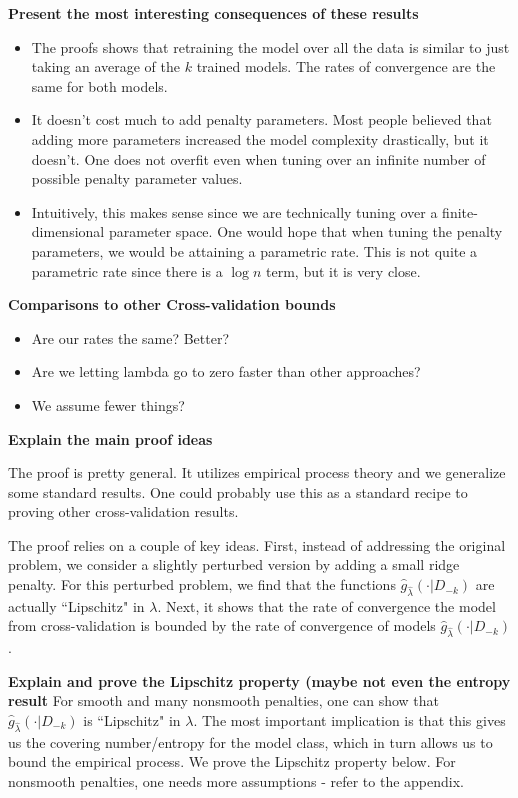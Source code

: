 \documentclass[12pt]{article}
\begin{document}
\textbf{Present the most interesting consequences of these results}
\begin{itemize}
\item{The proofs shows that retraining the model over all the data is similar to just taking an average of the $k$ trained models. The rates of convergence are the same for both models.}
\item{It doesn't cost much to add penalty parameters. Most people believed that adding more parameters increased the model complexity drastically, but it doesn't. One does not overfit even when tuning over an infinite number of possible penalty parameter values.}
\item{Intuitively, this makes sense since we are technically tuning over a finite-dimensional parameter space. One would hope that when tuning the penalty parameters, we would be attaining a parametric rate. This is not quite a parametric rate since there is a $\log n$ term, but it is very close.}
\end{itemize}

\textbf{Comparisons to other Cross-validation bounds}
\begin{itemize}
\item{Are our rates the same? Better?}
\item{Are we letting lambda go to zero faster than other approaches?}
\item{We assume fewer things?}
\end{itemize}


\textbf{Explain the main proof ideas}

The proof is pretty general. It utilizes empirical process theory and we generalize some standard results. One could probably use this as a standard recipe to proving other cross-validation results.

The proof relies on a couple of key ideas. First, instead of addressing the original problem, we consider a slightly perturbed version by adding a small ridge penalty. For this perturbed problem, we find that the functions $\hat{g}_{\hat \lambda}(\cdot|D_{-k})$ are actually ``Lipschitz" in $\lambda$. Next, it shows that the rate of convergence the model from cross-validation is bounded by the rate of convergence of models $\hat{g}_{\hat \lambda}(\cdot|D_{-k})$. 

\textbf{Explain and prove the Lipschitz property (maybe not even the entropy result}
For smooth and many nonsmooth penalties, one can show that $\hat{g}_{\hat \lambda}(\cdot|D_{-k})$ is ``Lipschitz" in $\lambda$.  The most important implication is that this gives us the covering number/entropy for the model class, which in turn allows us to bound the empirical process. We prove the Lipschitz property below. For nonsmooth penalties, one needs more assumptions - refer to the appendix.
\end{document}

